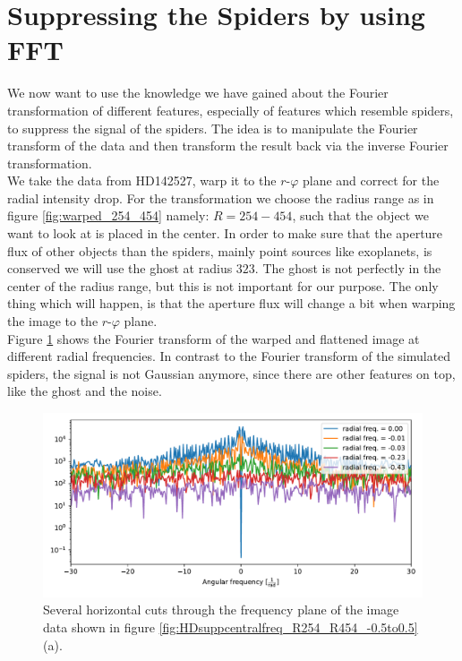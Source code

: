 \section{Suppressing the Spiders by using FFT}
\label{sec:suppression_divide}
We now want to use the knowledge we have gained about the Fourier transformation of different features, especially of features which resemble spiders, to suppress the signal of the spiders. The idea is to manipulate the Fourier transform of the data and then transform the result back via the inverse Fourier transformation.\\
We take the data from HD142527, warp it to the $r$-$\varphi$ plane and correct for the radial intensity drop. For the transformation we choose the radius range as in figure \ref{fig:warped_254_454} namely: $R=254-454$, such that the object we want to look at is placed in the center. In order to make sure that the aperture flux of other objects than the spiders, mainly point sources like exoplanets, is conserved we will use the ghost at radius $323$. The ghost is not perfectly in the center of the radius range, but this is not important for our purpose. The only thing which will happen, is that the aperture flux will change a bit when warping the image to the $r$-$\varphi$ plane.\\
Figure \ref{fig:rad0} shows the Fourier transform of the warped and flattened image at different radial frequencies. In contrast to the Fourier transform of the simulated spiders, the signal is not Gaussian anymore, since there are other features on top, like the ghost and the noise.
\begin{figure}[H]
	\centering
		\includegraphics[width=1.0\textwidth]{pics/rad0.pdf}
		\caption{Several horizontal cuts through the frequency plane of the image data shown in figure \ref{fig:HDsuppcentralfreq_R254_R454_-0.5to0.5}(a).}
		\label{fig:rad0}
\end{figure} 

